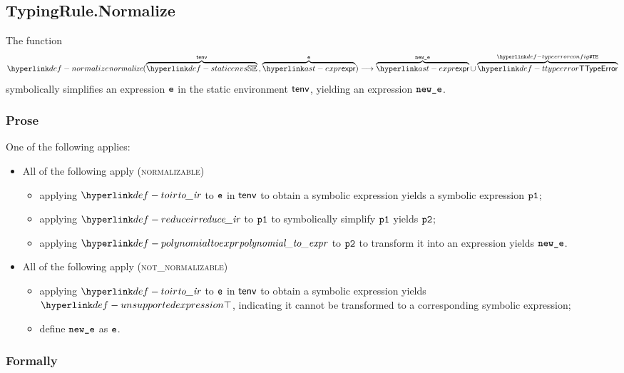 \subsection{TypingRule.Normalize \label{sec:TypingRule.Normalize}}
\hypertarget{def-normalize}{}
The function
\[
\normalize(\overname{\staticenvs}{\tenv} \aslsep \overname{\expr}{\ve}) \aslto \overname{\expr}{\newe} \cup \overname{\TTypeError}{\TypeErrorConfig}
\]
\hypertarget{def-symbolicallysimplifies}{symbolically simplifies} an expression $\texttt{e}$ in the static environment $\textsf{tenv}$,
yielding an expression $\texttt{new\_e}$.
\ProseOtherwiseTypeError

\subsubsection{Prose}
One of the following applies:
\begin{itemize}
  \item All of the following apply (\textsc{normalizable})
  \begin{itemize}
    \item applying $\toir$ to $\texttt{e}$ in $\textsf{tenv}$ to obtain a symbolic expression yields a symbolic expression $\texttt{p1}$\ProseOrTypeError;
    \item applying $\reduceir$ to $\texttt{p1}$ to symbolically simplify $\texttt{p1}$ yields $\texttt{p2}$;
    \item applying $\polynomialtoexpr$ to $\texttt{p2}$ to transform it into an expression yields $\texttt{new\_e}$.
  \end{itemize}

  \item All of the following apply (\textsc{not\_normalizable})
  \begin{itemize}
    \item applying $\toir$ to $\texttt{e}$ in $\textsf{tenv}$ to obtain a symbolic expression yields $\CannotBeTransformed$,
          indicating it cannot be transformed to a corresponding symbolic expression;
    \item define $\texttt{new\_e}$ as $\texttt{e}$.
  \end{itemize}
\end{itemize}
\subsubsection{Formally}

